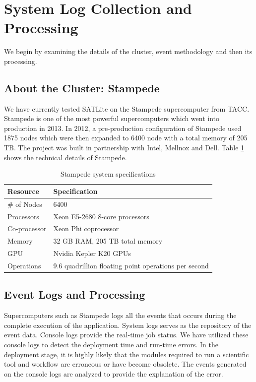 \documentclass[10pt]{ruthesis}
\begin{document}
\section{System Log Collection and Processing}
We begin by examining the details of the cluster, event methodology and then its processing.

\subsection{About the Cluster: Stampede}
We have currently tested SATLite on the Stampede supercomputer from TACC. Stampede is one of the most powerful supercomputers which went into production in 2013. In 2012, a pre-production configuration of Stampede used 1875 nodes which were then expanded to 6400 node with a total memory of 205 TB. The project was built in partnership with Intel, Mellnox and Dell. Table \ref{stampedespec} shows the technical details of Stampede.

\begin{table}
\begin{center}
\def\arraystretch{1.5}
\begin{tabular}{|p{3cm}|p{10cm}|}
\hline
\rule{0pt}{15pt} \textbf{Resource} & \textbf{Specification} \\[2ex]
\hline
\# of Nodes & 6400
\\
\hline
Processors & Xeon E5-2680 8-core processors
\\
\hline
Co-processor & Xeon Phi coprocessor
\\
\hline
Memory & 32 GB RAM, 205 TB total memory
\\
\hline
GPU & Nvidia Kepler K20 GPUs
\\
\hline
Operations & 9.6 quadrillion floating point operations per second
\\
\hline
\end{tabular}
\end{center}
\caption{Stampede system specifications}
\label{stampedespec}
\end{table}

\subsection{Event Logs and Processing}
Supercomputers such as Stampede logs all the events that occurs during the complete execution of the application. System logs serves as the repository of the event data. Console logs provide the real-time job status. We have utilized these console logs to detect the deployment time and run-time errors. In the deployment stage, it is highly likely that the modules required to run a scientific tool and workflow are erroneous or have become obsolete. The events generated on the console logs are analyzed to provide the explanation of the error.
\end{document}

